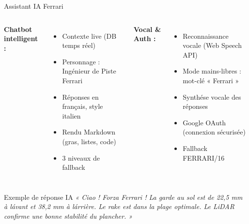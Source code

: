 \documentclass[11pt,aspectratio=169]{beamer}
\begin{document}
\begin{frame}{Assistant IA Ferrari}
  \begin{columns}
    \textbf{\textcolor{ferrariRed}{Chatbot intelligent :}} \\[0.2cm]
    \begin{itemize}
      \item Contexte live (DB temps r\'eel)
      \item Personnage : Ing\'enieur de Piste Ferrari
      \item R\'eponses en fran\c{c}ais, style italien
      \item Rendu Markdown (gras, listes, code)
      \item 3 niveaux de fallback
    \end{itemize}

    \textbf{\textcolor{ferrariRed}{Vocal \& Auth :}} \\[0.2cm]
    \begin{itemize}
      \item Reconnaissance vocale (Web Speech API)
      \item Mode mains-libres : mot-cl\'e « Ferrari »
      \item Synth\'ese vocale des r\'eponses
      \item Google OAuth (connexion s\'ecuris\'ee)
      \item Fallback FERRARI/16
    \end{itemize}
  \end{columns}

  \vspace{0.4cm}
  \begin{block}{Exemple de r\'eponse IA}
    \small
    \textcolor{ferrariGreen}{\textit{« Ciao ! Forza Ferrari ! La garde au sol est de 22,5 mm \`a l\'avant et 38,2 mm \`a l\'arri\`ere. Le rake est dans la plage optimale. Le LiDAR confirme une bonne stabilit\'e du plancher. »}}
  \end{block}
\end{frame}
\end{document}
